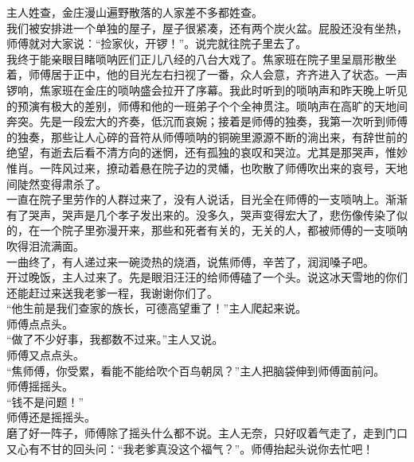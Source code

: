 主人姓查，金庄漫山遍野散落的人家差不多都姓查。
\\

我们被安排进一个单独的屋子，屋子很紧凑，还有两个炭火盆。屁股还没有坐热，师傅就对大家说：“捡家伙，开锣！”。说完就往院子里去了。\\

我终于能亲眼目睹唢呐匠们正儿八经的八台大戏了。焦家班在院子里呈扇形散坐着，师傅居于正中，他的目光左右扫视了一番，众人会意，齐齐进入了状态。一声锣响，焦家班在金庄的唢呐盛会拉开了序幕。我此时听到的唢呐声和昨天晚上听见的预演有极大的差别，师傅和他的一班弟子个个全神贯注。唢呐声在高旷的天地间奔突。先是一段宏大的齐奏，低沉而哀婉；接着是师傅的独奏，我第一次听到师傅的独奏，那些让人心碎的音符从师傅唢呐的铜碗里源源不断的淌出来，有辞世前的绝望，有逝去后看不清方向的迷惘，还有孤独的哀叹和哭泣。尤其是那哭声，惟妙惟肖。一阵风过来，撩动着悬在院子边的灵幡，也吹散了师傅吹出来的哀号，天地间陡然变得肃杀了。
\\

一直在院子里劳作的人群过来了，没有人说话，目光全在师傅的一支唢呐上。渐渐有了哭声，哭声是几个孝子发出来的。没多久，哭声变得宏大了，悲伤像传染了似的，在一个院子里弥漫开来，那些和死者有关的，无关的人，都被师傅的一支唢呐吹得泪流满面。
\\

一曲终了，有人递过来一碗烫热的烧酒，说焦师傅，辛苦了，润润嗓子吧。
\\

开过晚饭，主人过来了。先是眼泪汪汪的给师傅磕了一个头。说这冰天雪地的你们还能赶过来送我老爹一程，我谢谢你们了。
\\

“他生前是我们查家的族长，可德高望重了！”主人爬起来说。
\\

师傅点点头。
\\

“做了不少好事，我都数不过来。”主人又说。
\\

师傅又点点头。
\\

“焦师傅，你受累，看能不能给吹个百鸟朝凤？”主人把脑袋伸到师傅面前问。
\\

师傅摇摇头。
\\

“钱不是问题！”\\

师傅还是摇摇头。
\\

磨了好一阵子，师傅除了摇头什么都不说。主人无奈，只好叹着气走了，走到门口又心有不甘的回头问：“我老爹真没这个福气？”。师傅抬起头说你去忙吧！
\\

